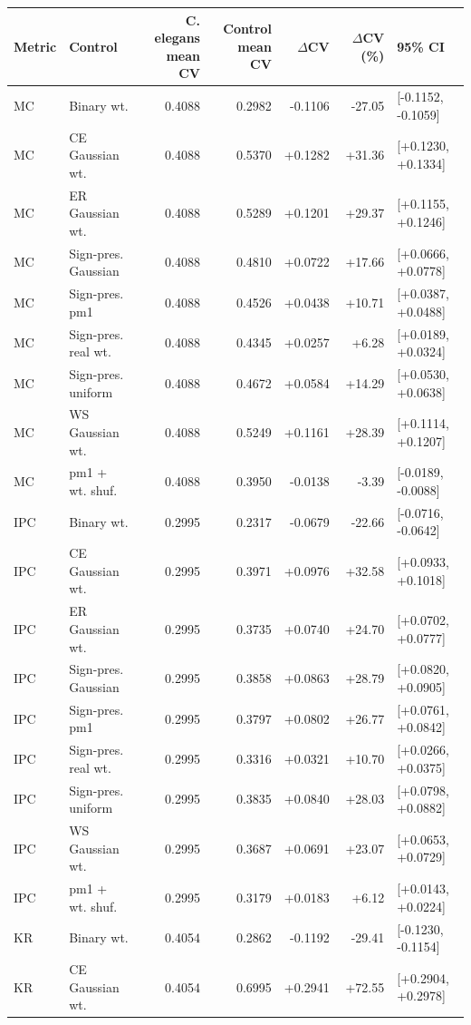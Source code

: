 \begin{tabular}{llrrrrl}
\toprule
Metric & Control & C. elegans mean CV & Control mean CV & $\Delta$CV & $\Delta$CV (\%) & 95\% CI \\
\midrule
MC & Binary wt. & 0.4088 & 0.2982 & -0.1106 & -27.05 & [-0.1152, -0.1059] \\
MC & CE Gaussian wt. & 0.4088 & 0.5370 & +0.1282 & +31.36 & [+0.1230, +0.1334] \\
MC & ER Gaussian wt. & 0.4088 & 0.5289 & +0.1201 & +29.37 & [+0.1155, +0.1246] \\
MC & Sign-pres. Gaussian & 0.4088 & 0.4810 & +0.0722 & +17.66 & [+0.0666, +0.0778] \\
MC & Sign-pres. pm1 & 0.4088 & 0.4526 & +0.0438 & +10.71 & [+0.0387, +0.0488] \\
MC & Sign-pres. real wt. & 0.4088 & 0.4345 & +0.0257 & +6.28 & [+0.0189, +0.0324] \\
MC & Sign-pres. uniform & 0.4088 & 0.4672 & +0.0584 & +14.29 & [+0.0530, +0.0638] \\
MC & WS Gaussian wt. & 0.4088 & 0.5249 & +0.1161 & +28.39 & [+0.1114, +0.1207] \\
MC & pm1 + wt. shuf. & 0.4088 & 0.3950 & -0.0138 & -3.39 & [-0.0189, -0.0088] \\
IPC & Binary wt. & 0.2995 & 0.2317 & -0.0679 & -22.66 & [-0.0716, -0.0642] \\
IPC & CE Gaussian wt. & 0.2995 & 0.3971 & +0.0976 & +32.58 & [+0.0933, +0.1018] \\
IPC & ER Gaussian wt. & 0.2995 & 0.3735 & +0.0740 & +24.70 & [+0.0702, +0.0777] \\
IPC & Sign-pres. Gaussian & 0.2995 & 0.3858 & +0.0863 & +28.79 & [+0.0820, +0.0905] \\
IPC & Sign-pres. pm1 & 0.2995 & 0.3797 & +0.0802 & +26.77 & [+0.0761, +0.0842] \\
IPC & Sign-pres. real wt. & 0.2995 & 0.3316 & +0.0321 & +10.70 & [+0.0266, +0.0375] \\
IPC & Sign-pres. uniform & 0.2995 & 0.3835 & +0.0840 & +28.03 & [+0.0798, +0.0882] \\
IPC & WS Gaussian wt. & 0.2995 & 0.3687 & +0.0691 & +23.07 & [+0.0653, +0.0729] \\
IPC & pm1 + wt. shuf. & 0.2995 & 0.3179 & +0.0183 & +6.12 & [+0.0143, +0.0224] \\
KR & Binary wt. & 0.4054 & 0.2862 & -0.1192 & -29.41 & [-0.1230, -0.1154] \\
KR & CE Gaussian wt. & 0.4054 & 0.6995 & +0.2941 & +72.55 & [+0.2904, +0.2978] \\

\end{tabular}
